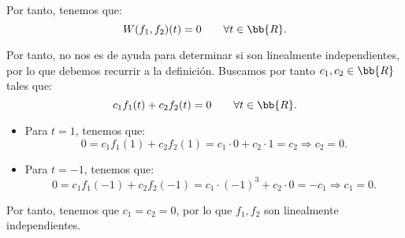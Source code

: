 \documentclass[12pt]{article}
\begin{document}
\begin{ejercicio}
        Por tanto, tenemos que:
        \begin{equation*}
            W(f_1,f_2)(t) = 0 \qquad \forall t \in \bb{R}.
        \end{equation*}

        Por tanto, no nos es de ayuda para determinar si son linealmente independientes, por lo que debemos recurrir a la definición. Buscamos por tanto $c_1,c_2\in \bb{R}$ tales que:
        \begin{equation*}
            c_1f_1(t) + c_2f_2(t) = 0 \qquad \forall t \in \bb{R}.
        \end{equation*}
        \begin{itemize}
            \item Para $t=1$, tenemos que:
            \begin{equation*}
                0 = c_1f_1(1) + c_2f_2(1) = c_1\cdot 0 + c_2\cdot 1 = c_2
                \Longrightarrow c_2 = 0.
            \end{equation*}

            \item Para $t=-1$, tenemos que:
            \begin{equation*}
                0 = c_1f_1(-1) + c_2f_2(-1) = c_1\cdot (-1)^3 + c_2\cdot 0 = -c_1
                \Longrightarrow c_1 = 0.
            \end{equation*}
        \end{itemize}

        Por tanto, tenemos que $c_1=c_2=0$, por lo que $f_1,f_2$ son linealmente independientes.
    \end{ejercicio}
\end{document}
